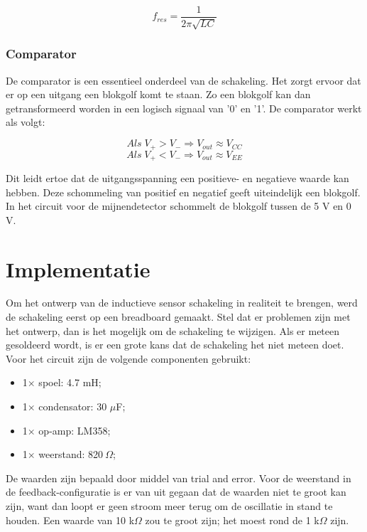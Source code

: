 \documentclass{report}
\begin{document}
\begin{equation}
f_{res}=\frac{1}{2\pi\sqrt{LC}}
\end{equation}

\subsubsection{Comparator}
De comparator is een essentieel onderdeel van de schakeling. Het zorgt ervoor dat er op een uitgang een blokgolf komt te staan. Zo een blokgolf kan dan getransformeerd worden in een logisch signaal van '0' en '1'. De comparator werkt als volgt:

\begin{equation}
Als \;V_+>V_- \Rightarrow V_{out}\approx V_{CC}
\end{equation}
\begin{equation}
Als \; V_+<V_- \Rightarrow V_{out}\approx V_{EE}
\end{equation}

Dit leidt ertoe dat de uitgangsspanning een positieve- en negatieve waarde kan hebben. Deze schommeling van positief en negatief geeft uiteindelijk een blokgolf. In het circuit voor de mijnendetector schommelt de blokgolf tussen de 5 V en 0 V.\\

\section{Implementatie}
Om het ontwerp van de inductieve sensor schakeling in realiteit te brengen, werd de schakeling eerst op een breadboard gemaakt. Stel dat er problemen zijn met het ontwerp, dan is het mogelijk om de schakeling te wijzigen. Als er meteen gesoldeerd wordt, is er een grote kans dat de schakeling het niet meteen doet.\\ 

\noindent Voor het circuit zijn de volgende componenten gebruikt:
\begin{itemize}
\item 1$\times$ spoel: 4.7 mH;
\item 1$\times$ condensator: 30 $\mu$F;
\item 1$\times$ op-amp: LM358;
\item 1$\times$ weerstand: 820$\: \Omega$;
\end{itemize}
De waarden zijn bepaald door middel van trial and error. Voor de weerstand in de feedback-configuratie is er van uit gegaan dat de waarden niet te groot kan zijn, want dan loopt er geen stroom meer terug om de oscillatie in stand te houden. Een waarde van 10 k$\Omega$ zou te groot zijn; het moest rond de 1 k$\Omega$ zijn.
\end{document}
